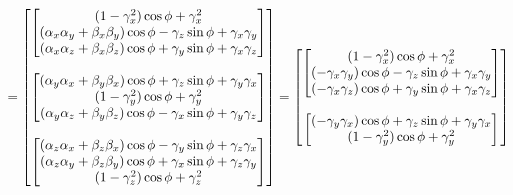\[
    =
    \begin{bmatrix}
        \begin{bmatrix}
            (1 - \gamma_x^2) \cos \phi + \gamma_x^2 \\
            (\alpha_x \alpha_y + \beta_x \beta_y) \cos \phi - \gamma_z \sin \phi + \gamma_x \gamma_y \\
            (\alpha_x \alpha_z + \beta_x \beta_z) \cos \phi + \gamma_y \sin \phi + \gamma_x \gamma_z \\
        \end{bmatrix} \\ \\
        \begin{bmatrix}
            (\alpha_y \alpha_x + \beta_y \beta_x) \cos \phi + \gamma_z \sin \phi + \gamma_y \gamma_x \\
            (1 - \gamma_y^2) \cos \phi + \gamma_y^2 \\
            (\alpha_y \alpha_z + \beta_y \beta_z) \cos \phi - \gamma_x \sin \phi + \gamma_y \gamma_z \\
        \end{bmatrix} \\ \\
        \begin{bmatrix}
            (\alpha_z \alpha_x + \beta_z \beta_x) \cos \phi - \gamma_y \sin \phi + \gamma_z \gamma_x \\
            (\alpha_z \alpha_y + \beta_z \beta_y) \cos \phi + \gamma_x \sin \phi + \gamma_z \gamma_y \\
            (1 - \gamma_z^2) \cos \phi + \gamma_z^2 \\
        \end{bmatrix} \\
    \end{bmatrix}
    =
    \begin{bmatrix}
        \begin{bmatrix}
            (1 - \gamma_x^2) \cos \phi + \gamma_x^2 \\
            (-\gamma_x \gamma_y) \cos \phi - \gamma_z \sin \phi + \gamma_x \gamma_y \\
            (-\gamma_x \gamma_z) \cos \phi + \gamma_y \sin \phi + \gamma_x \gamma_z \\
        \end{bmatrix} \\ \\
        \begin{bmatrix}
            (-\gamma_y \gamma_x) \cos \phi + \gamma_z \sin \phi + \gamma_y \gamma_x \\
            (1 - \gamma_y^2) \cos \phi + \gamma_y^2 \\

\end{bmatrix}
\end{bmatrix}\]

